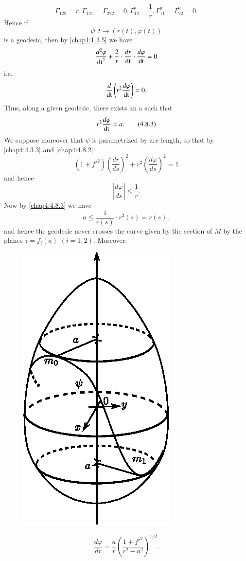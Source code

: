$$
\Gamma_{122}=r,\Gamma_{121}=\Gamma_{222}=0,
\Gamma_{12}^{2}=\frac{1}{r},\Gamma^{2}_{11}=\Gamma^{2}_{22}=0.
$$
Hence if
$$
\psi:t\to (r(t),\varphi(t))
$$
is a geodesic, then by \eqref{chap1:1.3.5} we have
$$
\frac{d^{2}\varphi}{\operatorname{dt}^{2}}+\frac{2}{r}\cdot \frac{dr}{\operatorname{dt}}\cdot
\frac{d\varphi}{\operatorname{dt}}=0 
$$
i.e.
$$
\frac{d}{\operatorname{dt}}\left(r^{2}\frac{d\varphi}{\operatorname{dt}}\right)=0.
$$
Thus, along a given geodesic, there exists an a such that
\begin{equation*}
r^{2}\frac{d\varphi}{\operatorname{dt}}=a.\tag{4.8.3}\label{chap4:4.8.3}
\end{equation*}
We suppose moreover that $\psi$ is parametrized by arc length, so that
by \eqref{chap4:4.3.3} and \eqref{chap4:4.8.2}:
$$
\left(1+{f'}^{2}\right)\left(\frac{dr}{ds}\right)^{2}+r^{2}\left(\frac{d\varphi}{ds}\right)^{2}=1 
$$\pageoriginale
and hence
$$
\left|\frac{d\varphi}{ds}\right|\leq \frac{1}{r}.
$$
Now by \eqref{chap4:4.8.3} we have
$$
a\leq \frac{1}{r(s)}\cdot r^{2}(s)=r(s),
$$
and hence the geodesic never crosses the curve given by the section of
$M$ by the planes $z=f_{i}(a)$ $(i=1,2)$. Moreover:
\begin{figure}[H]
\centering
\includegraphics{figures/chap4-fig5.eps}
\end{figure}
\begin{equation*}
\frac{d\varphi}{dr}=\frac{a}{r}\left(\frac{1+{f'}^{2}}{r^{2}-a^{2}}\right)^{1/2}.\tag{4.8.4}\label{chap4:4.8.4}
\end{equation*}

